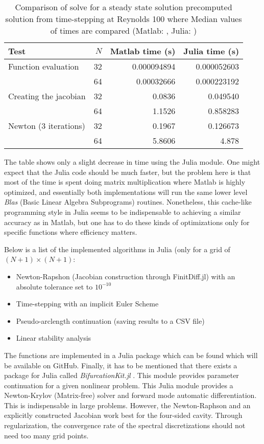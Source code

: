\begin{table}[ht]
  \caption{Comparison of solve for a steady state solution precomputed solution 
    from time-stepping at Reynolds 100 where Median values of times are compared
  (Matlab: , Julia: )}
  \label{tab:matlab_julia}
\begin{tabular}{lrrr}
Test & $N$ & Matlab time (s) & Julia time (s) \\
\hline
Function evaluation  & 32 & 0.000094894  & 0.000052603 \\
& 64 & 0.00032666 & 0.000223192 \\
 Creating the jacobian  & 32 & 0.0836  &  0.049540  \\
& 64 & 1.1526 & 0.858283 \\
Newton (3 iterations)  & 32 & 0.1967  & 0.126673 \\
& 64 & 5.8606  & 4.878 \\
\end{tabular}
\end{table}

The table shows only a slight decrease in time using the Julia module. One
might expect that the Julia code should be much faster, but the problem here is
that most of the time is spent doing matrix multiplication where Matlab is
highly optimized, and essentially both implementations will run the same lower
level \emph{Blas} (Basic Linear Algebra Subprograms) routines. Nonetheless,
this cache-like programming style in Julia seems to be indispensable to
achieving a similar accuracy as in Matlab, but one has to do these kinds of
optimizations only for specific functions where efficiency matters.

Below is a list of the implemented algorithms in Julia (only for a grid of
$(N+1) \times (N+1)$:

\begin{itemize}
\item Newton-Rapshon (Jacobian construction through FinitDiff.jl) with an absolute tolerance
  set to $10^{-10}$
\item Time-stepping with an implicit Euler Scheme
\item Pseudo-arclength continuation (saving results to a CSV file)
\item Linear stability analysis
\end{itemize}

The functions are implemented in a Julia package which can be found which will
be available on GitHub. Finally, it has to be mentioned that there exists a
package for Julia called \emph{BifurcationKit.jl} \citep{veltz2020}. This
module provides parameter continuation for a given nonlinear problem. This
Julia module provides a Newton-Krylov (Matrix-free) solver and forward mode
automatic differentiation. This is indispensable in large problems. However,
the Newton-Raphson and an explicitly constructed Jacobian work best for the
four-sided cavity. Through regularization, the convergence rate of the spectral
discretizations should not need too many grid points.
